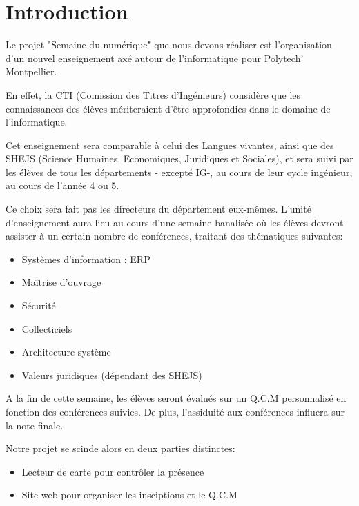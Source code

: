 \chapter{Introduction}

Le projet "Semaine du numérique" que nous devons réaliser est l’organisation
d'un nouvel enseignement axé autour de l'informatique pour Polytech' Montpellier.

En effet, la CTI (Comission des Titres d'Ingénieurs) considère que les 
connaissances des élèves mériteraient d'être approfondies dans le domaine de l'informatique.

Cet enseignement sera comparable à celui des Langues vivantes, ainsi que des
SHEJS (Science Humaines, Economiques, Juridiques et Sociales), et sera suivi
par les élèves de tous les départements - excepté IG-, au cours de leur cycle 
ingénieur, au cours de l'année 4 ou 5.

Ce choix sera fait pas les directeurs du département eux-mêmes. L'unité 
d'enseignement aura lieu au cours d'une semaine banalisée où les élèves 
devront assister à un certain nombre de conférences, traitant des thématiques 
suivantes:

\begin{itemize}
\item Systèmes d’information : ERP
\item Maîtrise d’ouvrage
\item Sécurité
\item Collecticiels
\item Architecture système
\item Valeurs juridiques (dépendant des SHEJS)
\end{itemize}

A la fin de cette semaine, les élèves seront évalués sur un Q.C.M personnalisé 
en fonction des conférences suivies. De plus, l'assiduité aux conférences influera
sur la note finale.

Notre projet se scinde alors en deux parties distinctes:

\begin{itemize}
\item Lecteur de carte pour contrôler la présence
\item Site web pour organiser les insciptions et le  Q.C.M
\end{itemize}
